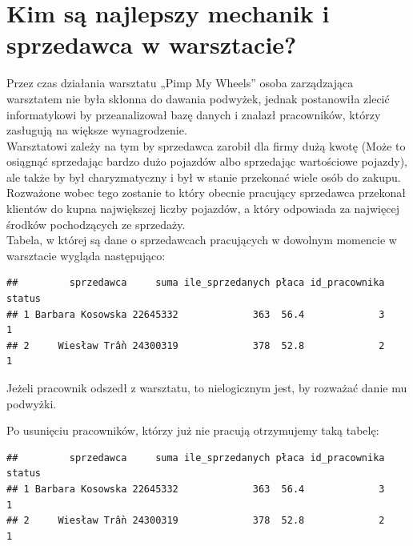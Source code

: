 \documentclass{article}\usepackage[]{graphicx}\usepackage[]{xcolor}
\makeatletter
\newenvironment{kframe}{%
 \def\at@end@of@kframe{}%
 \ifinner\ifhmode%
  \def\at@end@of@kframe{\end{minipage}}%
  \begin{minipage}{\columnwidth}%
 \fi\fi%
 \def\FrameCommand##1{\hskip\@totalleftmargin \hskip-\fboxsep
 \colorbox{shadecolor}{##1}\hskip-\fboxsep
     \hskip-\linewidth \hskip-\@totalleftmargin \hskip\columnwidth}%
 \MakeFramed {\advance\hsize-\width
   \@totalleftmargin\z@ \linewidth\hsize
   \@setminipage}}%
 {\par\unskip\endMakeFramed%
 \at@end@of@kframe}
\newenvironment{knitrout}{}{} %
\makeatother
\begin{document}
\section{Kim są najlepszy mechanik i sprzedawca w warsztacie?}

Przez czas działania warsztatu „Pimp My Wheels” osoba zarządzająca warsztatem nie była skłonna do dawania podwyżek, jednak postanowiła zlecić informatykowi by przeanalizował bazę danych i znalazł pracowników, którzy zasługują na większe wynagrodzenie. \\

Warsztatowi zależy na tym by sprzedawca zarobił dla firmy dużą kwotę (Może to osiągnąć sprzedając bardzo dużo pojazdów albo sprzedając wartościowe pojazdy), ale także by był charyzmatyczny i był w stanie przekonać wiele osób do zakupu. Rozważone wobec tego zostanie to który obecnie pracujący sprzedawca przekonał klientów do kupna największej liczby pojazdów, a który odpowiada za najwięcej środków pochodzących ze sprzedaży. \\


Tabela, w której są dane o sprzedawcach  pracujących w dowolnym momencie w warsztacie wygląda następująco:

\begin{knitrout}
\color{fgcolor}\begin{kframe}
\begin{verbatim}
##         sprzedawca     suma ile_sprzedanych płaca id_pracownika status
## 1 Barbara Kosowska 22645332             363  56.4             3      1
## 2     Wiesław Trần 24300319             378  52.8             2      1
\end{verbatim}
\end{kframe}
\end{knitrout}

Jeżeli pracownik odszedł z warsztatu, to nielogicznym jest, by rozważać danie mu podwyżki.

Po usunięciu pracowników, którzy już nie pracują otrzymujemy taką tabelę:

\begin{knitrout}
\color{fgcolor}\begin{kframe}
\begin{verbatim}
##         sprzedawca     suma ile_sprzedanych płaca id_pracownika status
## 1 Barbara Kosowska 22645332             363  56.4             3      1
## 2     Wiesław Trần 24300319             378  52.8             2      1
\end{verbatim}
\end{kframe}
\end{knitrout}
\end{document}
